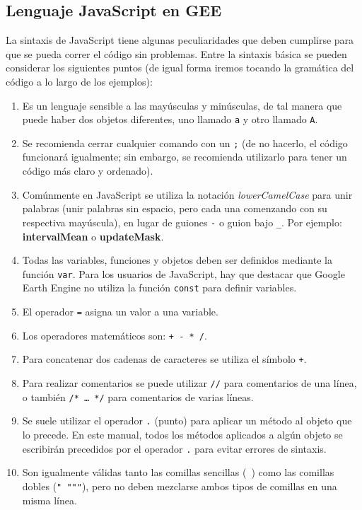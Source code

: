 \documentclass[
  12pt,
  letterpaper,
  twoside]{book}
\providecommand{\tightlist}{%
  \setlength{\itemsep}{0pt}\setlength{\parskip}{0pt}}
\newcommand\boldpurple[1]{\textcolor{darkpurple}{\textbf{#1}}}
\begin{document}
\hypertarget{lenguaje-javascript-en-gee}{%
\subsection*{Lenguaje JavaScript en GEE}\label{lenguaje-javascript-en-gee}}

La sintaxis de JavaScript tiene algunas peculiaridades que deben cumplirse para que se pueda correr el código sin problemas. Entre la sintaxis básica se pueden considerar los siguientes puntos (de igual forma iremos tocando la gramática del código a lo largo de los ejemplos):

\begin{enumerate}
\def\labelenumi{\arabic{enumi}.}
\tightlist
\item
  Es un lenguaje sensible a las mayúsculas y minúsculas, de tal manera que puede haber dos objetos diferentes, uno llamado \texttt{a} y otro llamado \texttt{A}.
\item
  Se recomienda cerrar cualquier comando con un \texttt{;} (de no hacerlo, el código funcionará igualmente; sin embargo, se recomienda utilizarlo para tener un código más claro y ordenado).
\item
  Comúnmente en JavaScript se utiliza la notación \emph{lowerCamelCase} para unir palabras (unir palabras sin espacio, pero cada una comenzando con su respectiva mayúscula), en lugar de guiones \texttt{-} o guion bajo \texttt{\_}. Por ejemplo: \boldpurple{intervalMean} o \boldpurple{updateMask}.
\item
  Todas las variables, funciones y objetos deben ser definidos mediante la función \texttt{var}. Para los usuarios de JavaScript, hay que destacar que Google Earth Engine no utiliza la función \texttt{const} para definir variables.
\item
  El operador \texttt{=} asigna un valor a una variable.
\item
  Los operadores matemáticos son: \texttt{+\ -\ *\ /}.
\item
  Para concatenar dos cadenas de caracteres se utiliza el símbolo \texttt{+}.
\item
  Para realizar comentarios se puede utilizar \texttt{//} para comentarios de una línea, o también \texttt{/*\ …\ */} para comentarios de varias líneas.
\item
  Se suele utilizar el operador \texttt{.} (punto) para aplicar un método al objeto que lo precede. En este manual, todos los métodos aplicados a algún objeto se escribirán precedidos por el operador \texttt{.} para evitar errores de sintaxis.
\item
  Son igualmente válidas tanto las comillas sencillas (\texttt{\textquotesingle{}\ \textquotesingle{}}) como las comillas dobles (\texttt{"\ """}), pero no deben mezclarse ambos tipos de comillas en una misma línea.
\end{enumerate}
\end{document}
